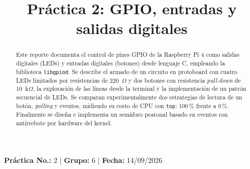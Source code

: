\documentclass[conference]{IEEEtran}
\begin{document}
\title{Práctica 2: GPIO, entradas y salidas digitales}

\author{
	\and
	\and
	\and
	\and
	\and
}

\maketitle

\begin{center}
	\vspace{-0.3cm}
	{\small
		\textbf{Práctica No.:} 2 \quad | \quad
		\textbf{Grupo:} 6 \quad | \quad
		\textbf{Fecha:} 14/09/2026
	}
	\vspace{0.2cm}
\end{center}

\begin{abstract}
	Este reporte documenta el control de pines GPIO de la Raspberry Pi 4 como salidas digitales (LEDs) y entradas digitales (botones) desde lenguaje C, empleando la biblioteca \texttt{libgpiod}. Se describe el armado de un circuito en protoboard con cuatro LEDs limitados por resistencias de 220~$\Omega$ y dos botones con resistencia \textit{pull-down} de 10~k$\Omega$, la exploración de las líneas desde la terminal y la implementación de un patrón secuencial de LEDs. Se comparan experimentalmente dos estrategias de lectura de un botón, \textit{polling} y eventos, midiendo su costo de CPU con \texttt{top}: 100\,\% frente a 0\,\%. Finalmente se diseña e implementa un semáforo peatonal basado en eventos con antirrebote por hardware del kernel.
\end{abstract}
\end{document}
